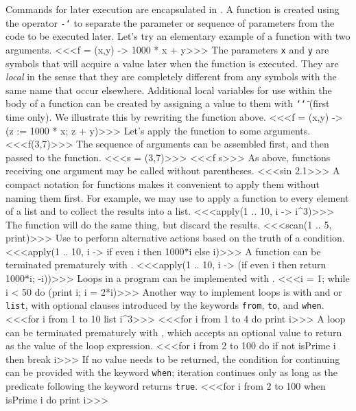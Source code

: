 Commands for later execution are encapsulated in {\sl {}}.  A function
is created using the operator {\tt -\char`\>}\indexcmd{->} to separate the parameter or
sequence of parameters from the code to be executed later.  Let's try an
elementary example of a function with two arguments.
<<<f = (x,y) -> 1000 * x + y>>>
The parameters {\tt x} and {\tt y} are symbols that will acquire a
value later when the function is executed.  They are {\sl local} in the sense that
they are completely different from any symbols with the same name that occur
elsewhere.  Additional local variables for use within the body of a function
can be created by assigning a value to them with {\tt \char`\:\char`\=}
\indexcmd{:=}
(first time only).  We illustrate this by rewriting the function above.
<<<f = (x,y) -> (z := 1000 * x; z + y)>>>
Let's apply the function to some arguments.
<<<f(3,7)>>>
The sequence of arguments can be assembled first, and then passed to the
function.
<<<s = (3,7)>>>
<<<f s>>>
As above, functions receiving one argument may be called without parentheses.
<<<sin 2.1>>>
A compact notation for functions makes it convenient to apply them
without naming them first.  For example, we may use  to apply a
function to every element of a list and to collect the results into a list.
<<<apply(1 .. 10, i -> i^3)>>>
The function  will do the same thing, but discard the results.
<<<scan(1 .. 5, print)>>>
Use  to perform alternative actions
based on the truth of a condition.
<<<apply(1 .. 10, i -> if even i then 1000*i else i)>>>
A function can be terminated prematurely with .
<<<apply(1 .. 10, i -> (if even i then return 1000*i; -i))>>>
Loops in a program can be implemented with .
<<<i = 1; while i < 50 do (print i; i = 2*i)>>>
Another way to implement loops is with  and
 or {\tt list}, with optional
clauses introduced by the keywords {\tt from}, {\tt to}, and {\tt when}.
<<<for i from 1 to 10 list i^3>>>
<<<for i from 1 to 4 do print i>>>
A loop can be terminated prematurely with , which accepts an
optional value to return as the value of the loop expression.
<<<for i from 2 to 100 do if not isPrime i then break i>>>
If no value needs to be returned, the condition for continuing can be
provided with the keyword {\tt when}; iteration continues only as long as the
predicate following the keyword returns {\tt true}.
<<<for i from 2 to 100 when isPrime i do print i>>>


